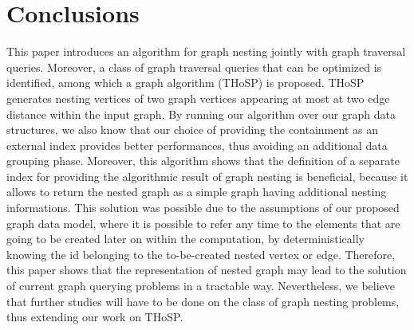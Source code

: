 \section{Conclusions}
This paper introduces an algorithm for graph nesting jointly with graph traversal queries. Moreover, a class of graph traversal queries that can be optimized is identified, among which a graph algorithm (THoSP) is proposed. THoSP generates nesting vertices of two graph vertices appearing at most at two edge distance within the input graph. By running our algorithm over our graph data structures, we also know that our choice of providing the containment as an external index provides better performances, thus avoiding an additional data grouping phase. Moreover, this algorithm shows that the definition of a separate index for providing the algorithmic result of graph nesting is beneficial, because it allows to return the nested graph as a simple graph having additional nesting informations. This solution was possible due to the assumptions of our proposed graph data model, where  it is possible to refer any time to the elements that are going to be created later on within the computation, by  deterministically knowing  the id belonging to the to-be-created nested vertex or edge.  Therefore, this paper shows that the representation of nested graph may lead to the solution of current graph querying problems in a tractable way. Nevertheless, we believe that further studies will have to be done on the class of  graph nesting problems, thus extending our work on THoSP.